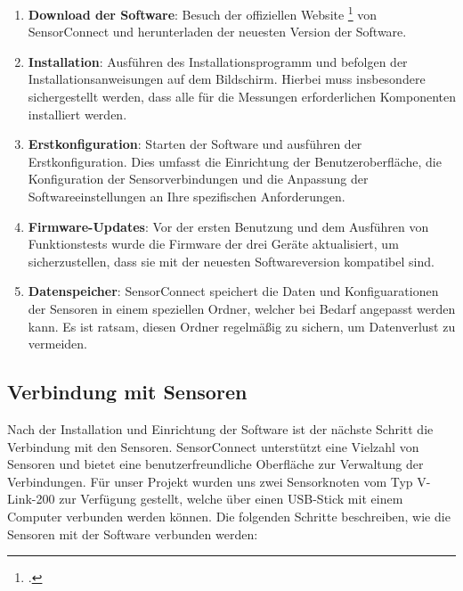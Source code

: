 \begin{enumerate}
    \item \textbf{Download der Software}: Besuch der offiziellen Website \footcite{https://www.microstrain.com/software/sensorconnect} von SensorConnect und herunterladen der neuesten Version der Software.
    \item \textbf{Installation}: Ausführen des Installationsprogramm und befolgen der Installationsanweisungen auf dem Bildschirm. Hierbei muss insbesondere sichergestellt werden, dass alle für die Messungen erforderlichen Komponenten installiert werden.
    \item \textbf{Erstkonfiguration}: Starten der Software und ausführen der Erstkonfiguration. Dies umfasst die Einrichtung der Benutzeroberfläche, die Konfiguration der Sensorverbindungen und die Anpassung der Softwareeinstellungen an Ihre spezifischen Anforderungen.
    \item \textbf{Firmware-Updates}: Vor der ersten Benutzung und dem Ausführen von Funktionstests wurde die Firmware der drei Geräte aktualisiert, um sicherzustellen, dass sie mit der neuesten Softwareversion kompatibel sind.
    \item \textbf{Datenspeicher}: SensorConnect speichert die Daten und Konfiguarationen der Sensoren in einem speziellen Ordner, welcher bei Bedarf angepasst werden kann. Es ist ratsam, diesen Ordner regelmäßig zu sichern, um Datenverlust zu vermeiden.
\end{enumerate}

\subsection{Verbindung mit Sensoren}
Nach der Installation und Einrichtung der Software ist der nächste Schritt die Verbindung mit den Sensoren. SensorConnect unterstützt eine Vielzahl von Sensoren und bietet eine benutzerfreundliche Oberfläche zur Verwaltung der Verbindungen. Für unser Projekt wurden uns zwei Sensorknoten vom Typ V-Link-200 zur Verfügung gestellt, welche über einen USB-Stick mit einem Computer verbunden werden können. Die folgenden Schritte beschreiben, wie die Sensoren mit der Software verbunden werden:


